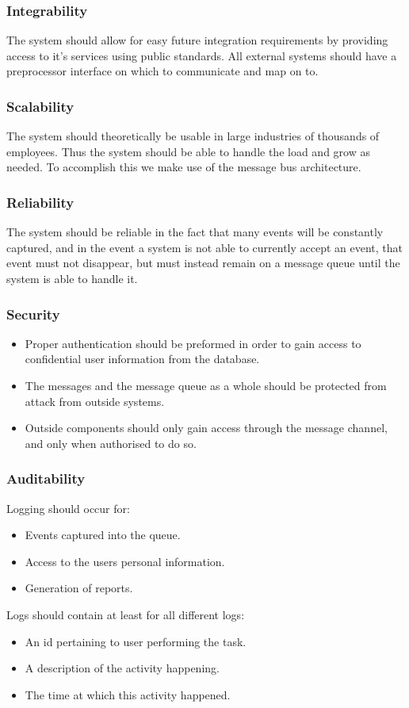 \documentclass[11pt,a4paper]{article}
\begin{document}
\subsubsection{Integrability}
The system should allow for easy future integration requirements by providing access to it's services using public standards. All external systems should have a preprocessor interface on which to communicate and map on to.

\subsubsection{Scalability}
The system should theoretically be usable in large industries of thousands of employees. Thus the system should be able to handle the load and grow as needed. To accomplish this we make use of the message bus architecture.

\subsubsection{Reliability}
The system should be reliable in the fact that many events will be constantly captured, and in the event a system is not able to currently accept an event, that event must not disappear, but must instead remain on a message queue until the system is able to handle it.

\subsubsection{Security}
\begin{itemize}
	\item Proper authentication should be preformed in order to gain access to confidential user information from the database. 
	\item The messages and the message queue as a whole should be protected from attack from outside systems.
	\item Outside components should only gain access through the message channel, and only when authorised to do so.
\end{itemize}

\subsubsection{Auditability}
Logging should occur for:
\begin{itemize}
	\item Events captured into the queue.
	\item Access to the users personal information.
	\item Generation of reports.
\end{itemize}
Logs should contain at least for all different logs:
\begin{itemize}
	\item An id pertaining to user performing the task.
	\item A description of the activity happening.
	\item The time at which this activity happened.
\end{itemize}
\end{document}
